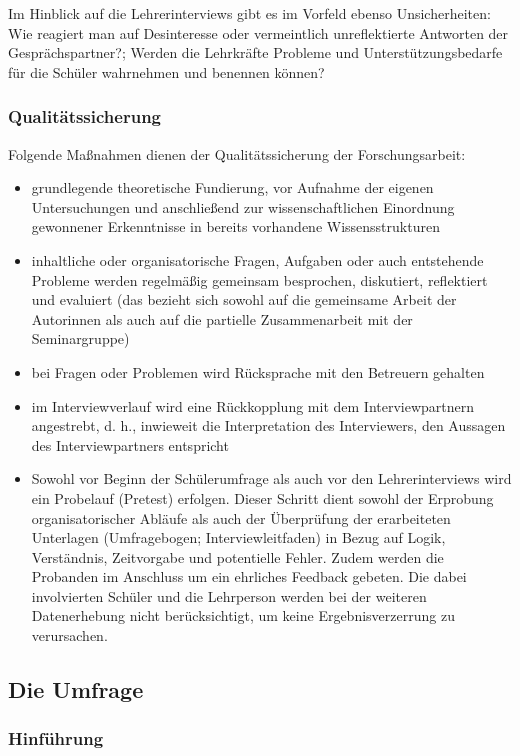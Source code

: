 Im Hinblick auf die Lehrerinterviews gibt es im Vorfeld ebenso Unsicherheiten: Wie reagiert man auf Desinteresse oder vermeintlich unreflektierte Antworten der Gesprächspartner?; Werden die Lehrkräfte Probleme und Unterstützungsbedarfe für die Schüler wahrnehmen und benennen können? 

\subsubsection{Qualitätssicherung}
\label{sec:Qualitätssicherung}

Folgende Maßnahmen dienen der Qualitätssicherung der Forschungsarbeit:
\begin{itemize}
	\item grundlegende theoretische Fundierung, vor Aufnahme der eigenen Untersuchungen und anschließend zur wissenschaftlichen Einordnung gewonnener Erkenntnisse in bereits vorhandene Wissensstrukturen
	\item inhaltliche oder organisatorische Fragen, Aufgaben oder auch entstehende Probleme werden regelmäßig gemeinsam besprochen, diskutiert, reflektiert und evaluiert (das bezieht sich sowohl auf die gemeinsame Arbeit der Autorinnen als auch auf die partielle Zusammenarbeit mit der Seminargruppe)
	\item bei Fragen oder Problemen wird Rücksprache mit den Betreuern gehalten
	\item im Interviewverlauf wird eine Rückkopplung mit dem Interviewpartnern angestrebt, d. h., inwieweit die Interpretation des Interviewers, den Aussagen des Interviewpartners entspricht
	\item Sowohl vor Beginn der Schülerumfrage als auch vor den Lehrerinterviews wird ein Probelauf (Pretest) erfolgen. Dieser Schritt dient sowohl der Erprobung organisatorischer Abläufe als auch der Überprüfung der erarbeiteten Unterlagen (Umfragebogen; Interviewleitfaden) in Bezug auf Logik, Verständnis, Zeitvorgabe und potentielle Fehler. Zudem werden die Probanden im Anschluss um ein ehrliches Feedback gebeten. Die dabei involvierten Schüler und die Lehrperson werden bei der weiteren Datenerhebung nicht berücksichtigt, um keine Ergebnisverzerrung zu verursachen.
\end{itemize}

\subsection{Die Umfrage}
\label{sec:DieUmfrage}

\subsubsection{Hinführung}
\label{sec:Hinführung}

